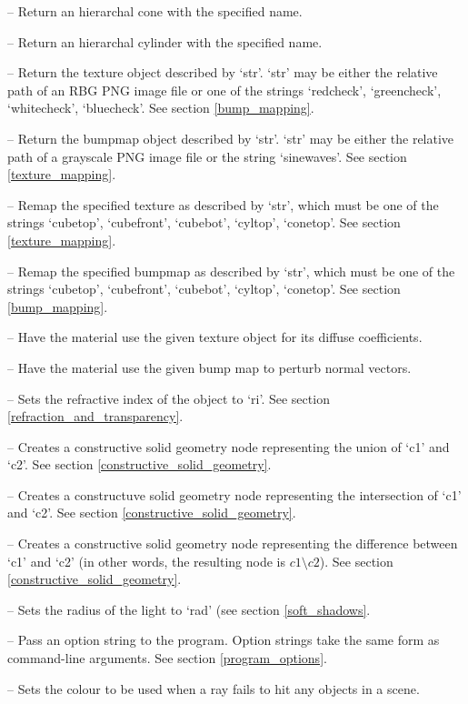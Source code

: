 \documentclass{article}
\begin{document}
\begin{itemize}

   -- Return an hierarchal cone with the specified name.

   -- Return an hierarchal cylinder with the
  specified name.

   -- Return the texture object described by `str'.
  `str' may be either the relative path of an RBG PNG image file or one of the
  strings `redcheck', `greencheck', `whitecheck', `bluecheck'. See section
  \ref{bump_mapping}.

   -- Return the bumpmap object described by `str'.
  `str' may be either the relative path of a grayscale PNG image file or the
  string `sinewaves'. See section \ref{texture_mapping}.

   -- Remap the specified texture as described by
  `str', which must be one of the strings `cubetop', `cubefront', `cubebot',
  `cyltop', `conetop'. See section \ref{texture_mapping}.

   -- Remap the specified bumpmap as described by
  `str', which must be one of the strings `cubetop', `cubefront', `cubebot',
  `cyltop', `conetop'. See section \ref{bump_mapping}.

   -- Have the material use the given
  texture object for its diffuse coefficients.

   -- Have the material use the given
  bump map to perturb normal vectors.

   -- Sets the refractive index of the object to
  `ri'. See section \ref{refraction_and_transparency}.

   -- Creates a constructive solid geometry node representing
  the union of `c1' and `c2'. See section \ref{constructive_solid_geometry}.

   -- Creates a constructuve solid geometry node
  representing the intersection of `c1' and `c2'. See section
  \ref{constructive_solid_geometry}.

   -- Creates a constructive solid geometry node
  representing the difference between `c1' and `c2' (in other words, the
  resulting node is $c1 \setminus c2$). See section
  \ref{constructive_solid_geometry}.

   -- Sets the radius of the light to `rad' (see
  section \ref{soft_shadows}.

   -- Pass an option string to the program. Option strings
  take the same form as command-line arguments. See section
  \ref{program_options}.

   -- Sets the colour to be used when a
  ray fails to hit any objects in a scene.

\end{itemize}
\end{document}
